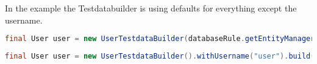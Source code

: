In the example the Testdatabuilder is using defaults for everything except the username.

\begin{lstlisting}[language={JAVA},caption=Build an persistent User object]
final User user = new UserTestdataBuilder(databaseRule.getEntityManager()).withUsername("user").buildAndSave();
\end{lstlisting}

\begin{lstlisting}[language={JAVA},caption=Build an transient User object]
final User user = new UserTestdataBuilder().withUsername("user").build()
\end{lstlisting}
